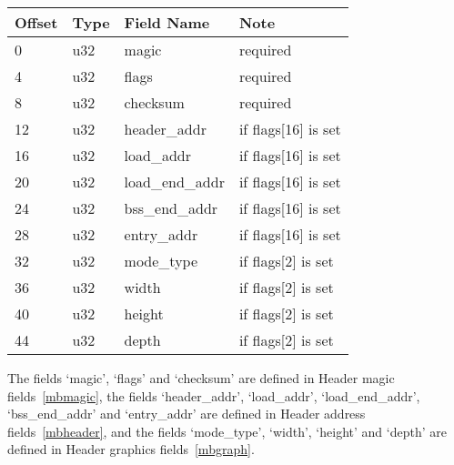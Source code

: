 \bigskip
\begin{tabular}{l l l l}
Offset	&Type	&Field Name	&Note\\
\hline 
0	&u32	&magic	&required\\ 
4	&u32	&flags	&required\\ 
8	&u32	&checksum	&required\\ 
12	&u32	&header\_addr	&if flags[16] is set\\ 
16	&u32	&load\_addr	&if flags[16] is set\\ 
20	&u32	&load\_end\_addr	&if flags[16] is set\\ 
24	&u32	&bss\_end\_addr	&if flags[16] is set\\ 
28	&u32	&entry\_addr	&if flags[16] is set\\ 
32	&u32	&mode\_type	&if flags[2] is set\\ 
36	&u32	&width	&if flags[2] is set\\ 
40	&u32	&height	&if flags[2] is set\\ 
44	&u32	&depth	&if flags[2] is set\\
\end{tabular}
\bigskip

The fields ‘magic’, ‘flags’ and ‘checksum’ are defined in Header magic fields\
\ref{mbmagic}, the fields ‘header\_addr’, ‘load\_addr’, ‘load\_end\_addr’,
‘bss\_end\_addr’ and ‘entry\_addr’ are defined in Header address fields\
\ref{mbheader}, and the fields ‘mode\_type’, ‘width’, ‘height’ and ‘depth’ are
defined in Header graphics fields\ \ref{mbgraph}.

\label{mbmagic}

